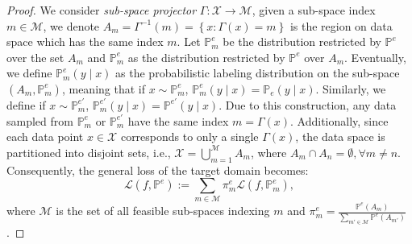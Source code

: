 \begin{proof}
We consider \textit{sub-space projector} $\Gamma: \mathcal{X}\rightarrow \mathcal{M}$, given a sub-space index $m\in \mathcal{M}$, we denote $A_{m}=\Gamma^{-1}(m)=\left\{ x:\Gamma(x)=m\right\} $ is the region on data space which has the same index $m$.
Let $\mathbb{P}_{m}^{e}$ be the distribution restricted by $\mathbb{P}^{e}$ over the set $A_{m}$ and $\mathbb{P}_{m}^{e}$ as the distribution restricted by $\mathbb{P}^{e}$
over $A_{m}$. Eventually, we define $\mathbb{P}_{m}^{e}\left(y\mid x\right)$ as the probabilistic labeling
distribution on the sub-space $\left(A_{m},\mathbb{P}_{m}^{e}\right)$,
meaning that if $x\sim\mathbb{P}_{m}^{e}$, $\mathbb{P}_{m}^{e}\left(y\mid x\right)=\mathbb{P}_{e}\left(y\mid x\right)$.
Similarly, we define if $x\sim\mathbb{P}_{m}^{e'}$, $\mathbb{P}_{m}^{e'}\left(y\mid x\right)=\mathbb{P}^{e'}\left(y\mid x\right)$. Due to this construction, any data sampled from $\mathbb{P}_{m}^{e}$
or $\mathbb{P}_{m}^{e'}$ have the same index $m=\Gamma(x)$. 
Additionally, since each data point $x \in \mathcal{X}$ corresponds to only a single $\Gamma(x)$, the data space is partitioned into disjoint sets, i.e., $\mathcal{X} = \bigcup_{m=1}^{\mathcal{M}} A_{m}$, where $A_m \cap A_n = \emptyset, \forall m \neq n$. 
Consequently, the general loss of the target domain becomes:
\begin{equation}
\mathcal{L}\left(f,\mathbb{P}^{e}\right):=\sum_{m\in\mathcal{M}}\pi^{e}_m\mathcal{L}\left(f,\mathbb{P}_{m}^{e}\right),\label{eq:subspace_loss}
\end{equation}
where $\mathcal{M}$ is the set of all feasible sub-spaces indexing $m$ and  $\pi^{e}_m=\frac{\mathbb{P}^{e}\left(A_{m}\right)}{\sum_{m'\in\mathcal{M}}\mathbb{P}^{e}\left(A_{m'}\right)}$.

\end{proof}

